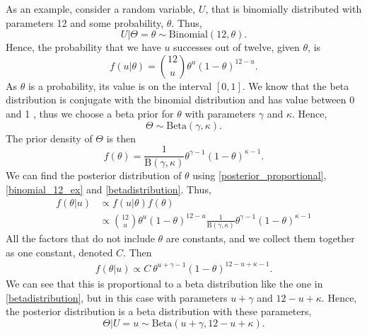 As an example, consider a random variable, $U$, that is binomially distributed with parameters 12 and some probability, $\theta$. Thus,
\begin{equation*}
    U|\Theta=\theta \sim \mathrm{Binomial}(12,\theta).
\end{equation*}
Hence, the probability that we have $u$ successes out of twelve, given $\theta$, is
\begin{equation}
\label{binomial_12_ex}
    f(u|\theta) = \binom{12}{u} \theta^{u} (1-\theta)^{12-u}.
\end{equation}
As $\theta$ is a probability, its value is on the interval $[0,1]$. We know that the beta distribution is conjugate with the binomial distribution and has value between 0 and 1 \citep{statinf}, thus we choose a beta prior for $\theta$ with parameters $\gamma$ and $\kappa$. Hence,
\begin{equation}
\label{theta_with_beta_prior}
    \Theta \sim \mathrm{Beta}(\gamma,\kappa). 
\end{equation}
The prior density of $\Theta$ is then
\begin{equation}
    \label{betadistribution}
    f(\theta) = \frac{1}{\mathrm{B}(\gamma,\kappa)}\theta^{\gamma-1}(1-\theta)^{\kappa-1}.
\end{equation}
We can find the posterior distribution of $\theta$ using \eqref{posterior_proportional}, \eqref{binomial_12_ex} and \eqref{betadistribution}. Thus,
\begin{equation*}
    \begin{aligned}
        f(\theta|u) 
        &\propto f(u|\theta)f(\theta)\\[6pt]
        &\propto \binom{12}{u} \theta^{u} (1-\theta)^{12-u} \frac{1}{\mathrm{B}(\gamma,\kappa)}\theta^{\gamma-1}(1-\theta)^{\kappa-1}
    \end{aligned}
\end{equation*}
All the factors that do not include $\theta$ are constants, and we collect them together as one constant, denoted $C$. Then
\begin{equation*}
    \begin{aligned}
        f(\theta|u) 
        \propto C \: \theta^{u+\gamma-1}(1-\theta)^{12-u+\kappa-1}.
    \end{aligned}
\end{equation*}
We can see that this is proportional to a beta distribution like the one in \eqref{betadistribution}, but in this case with parameters $u+\gamma$ and $12-u+\kappa$. Hence, the posterior distribution is a beta distribution with these parameters, 
\begin{equation*}
    \Theta|U=u \sim \mathrm{Beta}(u+\gamma,12-u+\kappa).
\end{equation*}






